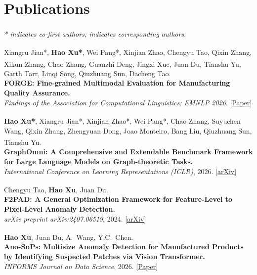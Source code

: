 \documentclass[11pt, a4paper]{article}
\begin{document}
\section{Publications}
\small\textit{* indicates co-first authors; \textsuperscript{\textdagger} indicates corresponding authors.}
\vspace{2pt}

\begin{enumerate}[label={[\arabic*]}, leftmargin=2em, itemsep=4pt]

\item Xiangru Jian*, \textbf{Hao Xu*\textsuperscript{\textdagger}}, Wei Pang*, Xinjian Zhao, Chengyu Tao, Qixin Zhang,
  Xikun Zhang\textsuperscript{\textdagger}, Chao Zhang, Guanzhi Deng, Jingxi Xue, Juan Du, Tianshu Yu, Garth Tarr,
  Linqi Song, Qiuzhuang Sun, Dacheng Tao.\\
  \textbf{FORGE: Fine-grained Multimodal Evaluation for Manufacturing Quality Assurance.}\\
  \textit{Findings of the Association for Computational Linguistics: EMNLP 2026}.
  \href{https://aclanthology.org/2026.findings-emnlp.888/}{\small[Paper]}

\item \textbf{Hao Xu*}, Xiangru Jian*\textsuperscript{\textdagger}, Xinjian Zhao*, Wei Pang*, Chao Zhang, Suyuchen Wang,
  Qixin Zhang, Zhengyuan Dong, Joao Monteiro, Bang Liu, Qiuzhuang Sun, Tianshu Yu\textsuperscript{\textdagger}.\\
  \textbf{GraphOmni: A Comprehensive and Extendable Benchmark Framework for Large
  Language Models on Graph-theoretic Tasks.}\\
  \textit{International Conference on Learning Representations (ICLR)}, 2026.
  \href{https://arxiv.org/abs/2504.12764}{\small[arXiv]}

\item Chengyu Tao, \textbf{Hao Xu}, Juan Du\textsuperscript{\textdagger}.\\
  \textbf{F2PAD: A General Optimization Framework for Feature-Level to Pixel-Level
  Anomaly Detection.}\\
  \textit{arXiv preprint arXiv:2407.06519}, 2024.
  \href{https://arxiv.org/abs/2407.06519}{\small[arXiv]}

\item \textbf{Hao Xu}, Juan Du\textsuperscript{\textdagger}, A.\ Wang, Y.C.\ Chen.\\
  \textbf{Ano-SuPs: Multisize Anomaly Detection for Manufactured Products by
  Identifying Suspected Patches via Vision Transformer.}\\
  \textit{INFORMS Journal on Data Science}, 2026.
  \href{https://doi.org/10.1287/ijds.2024.0058}{\small[Paper]}

\end{enumerate}
\end{document}
